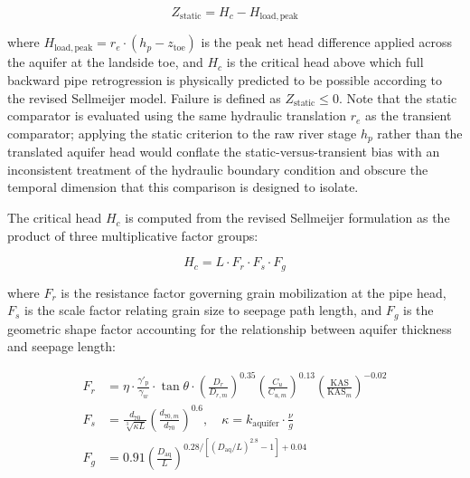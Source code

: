 $$Z_\mathrm{static} = H_c - H_\mathrm{load,peak}$$

where $H_\mathrm{load,peak} = r_e \cdot (h_p - z_\mathrm{toe})$ is the peak net head difference applied across the aquifer at the landside toe, and $H_c$ is the critical head above which full backward pipe retrogression is physically predicted to be possible according to the revised Sellmeijer model. Failure is defined as $Z_\mathrm{static} \leq 0$. Note that the static comparator is evaluated using the same hydraulic translation $r_e$ as the transient comparator; applying the static criterion to the raw river stage $h_p$ rather than the translated aquifer head would conflate the static-versus-transient bias with an inconsistent treatment of the hydraulic boundary condition and obscure the temporal dimension that this comparison is designed to isolate.

The critical head $H_c$ is computed from the revised Sellmeijer formulation \parencite{sellmeijer_2011} as the product of three multiplicative factor groups:

$$H_c = L \cdot F_r \cdot F_s \cdot F_g$$

where $F_r$ is the resistance factor governing grain mobilization at the pipe head, $F_s$ is the scale factor relating grain size to seepage path length, and $F_g$ is the geometric shape factor accounting for the relationship between aquifer thickness and seepage length:

\begin{align} F_r &= \eta \cdot \frac{\gamma'_\mathrm{p}}{\gamma_w} \cdot \tan\theta \cdot \left(\frac{D_r}{D_{r,m}}\right)^{0.35} \left(\frac{C_u}{C_{u,m}}\right)^{0.13} \left(\frac{\mathrm{KAS}}{\mathrm{KAS}_m}\right)^{-0.02} \\ F_s &= \frac{d_{70}}{\sqrt[3]{\kappa L}} \left(\frac{d_{70,m}}{d_{70}}\right)^{0.6}, \quad \kappa = k_\mathrm{aquifer}\cdot\frac{\nu}{g} \\ F_g &= 0.91 \left(\frac{D_\mathrm{aq}}{L}\right)^{0.28/[(D_\mathrm{aq}/L)^{2.8}-1]+0.04} \end{align}

